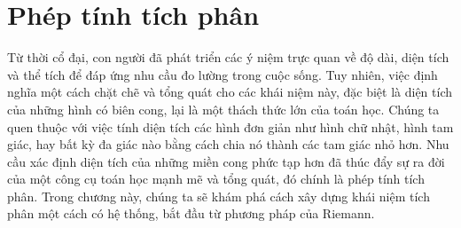 \chapter{Phép tính tích phân}

Từ thời cổ đại, con người đã phát triển các ý niệm trực quan về độ dài, diện tích và thể tích để đáp ứng nhu cầu đo lường trong cuộc sống. Tuy nhiên, việc định nghĩa một cách chặt chẽ và tổng quát cho các khái niệm này, đặc biệt là diện tích của những hình có biên cong, lại là một thách thức lớn của toán học. Chúng ta quen thuộc với việc tính diện tích các hình đơn giản như hình chữ nhật, hình tam giác, hay bất kỳ đa giác nào bằng cách chia nó thành các tam giác nhỏ hơn. Nhu cầu xác định diện tích của những miền cong phức tạp hơn đã thúc đẩy sự ra đời của một công cụ toán học mạnh mẽ và tổng quát, đó chính là phép tính tích phân. Trong chương này, chúng ta sẽ khám phá cách xây dựng khái niệm tích phân một cách có hệ thống, bắt đầu từ phương pháp của Riemann.




